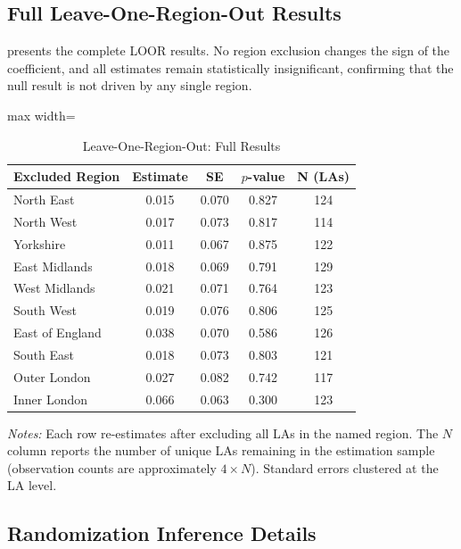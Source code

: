 \documentclass[12pt]{article}
\begin{document}
\subsection{Full Leave-One-Region-Out Results}

 presents the complete LOOR results. No region exclusion changes the sign of the coefficient, and all estimates remain statistically insignificant, confirming that the null result is not driven by any single region.

\begin{table}[H]
\centering
\caption{Leave-One-Region-Out: Full Results}
\label{tab:loor_full}
\begin{threeparttable}
\begin{adjustbox}{max width=\textwidth}
\begin{tabular}{lcccc}
\toprule
Excluded Region & Estimate & SE & $p$-value & N (LAs) \\
\midrule
North East & 0.015 & 0.070 & 0.827 & 124 \\
North West & 0.017 & 0.073 & 0.817 & 114 \\
Yorkshire & 0.011 & 0.067 & 0.875 & 122 \\
East Midlands & 0.018 & 0.069 & 0.791 & 129 \\
West Midlands & 0.021 & 0.071 & 0.764 & 123 \\
South West & 0.019 & 0.076 & 0.806 & 125 \\
East of England & 0.038 & 0.070 & 0.586 & 126 \\
South East & 0.018 & 0.073 & 0.803 & 121 \\
Outer London & 0.027 & 0.082 & 0.742 & 117 \\
Inner London & 0.066 & 0.063 & 0.300 & 123 \\
\bottomrule
\end{tabular}
\end{adjustbox}
\begin{tablenotes}[flushleft]
\small
\item \textit{Notes:} Each row re-estimates  after excluding all LAs in the named region. The $N$ column reports the number of unique LAs remaining in the estimation sample (observation counts are approximately $4 \times N$). Standard errors clustered at the LA level.
\end{tablenotes}
\end{threeparttable}
\end{table}

\subsection{Randomization Inference Details}
\end{document}
